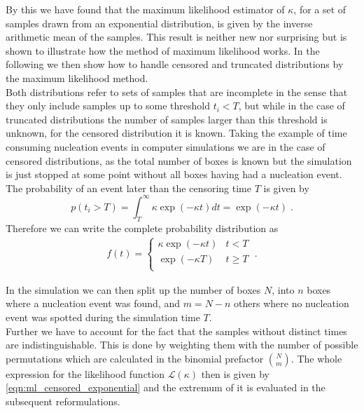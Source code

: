 By this we have found that the maximum likelihood estimator of $\kappa$, for a set of samples drawn from an exponential distribution, is given by the inverse arithmetic mean of the samples. This result is neither new nor surprising but is shown to illustrate how the method of maximum likelihood works. In the following we then show how to handle censored and truncated distributions by the maximum likelihood method.\\
Both distributions refer to sets of samples that are incomplete in the sense that they only include samples up to some threshold $t_i < T$, but while in the case of truncated distributions the number of samples larger than this threshold is unknown, for the censored distribution it is known. Taking the example of time consuming nucleation events in computer simulations we are in the case of censored distributions, as the total number of boxes is known but the simulation is just stopped at some point without all boxes having had a nucleation event. The probability of an event later than the censoring time $T$ is given by
\begin{equation}
\label{eqn:prob_t_larger_T}
p(t_i>T) = \int_T^{\infty} \kappa \exp(-\kappa t) dt = \exp(-\kappa t) \; \text{.}
\end{equation}
Therefore we can write the complete probability distribution as
\begin{align}
\label{eqn:pdf_censored}
f(t) = 
\begin{cases}
\kappa \exp(-\kappa t) & t < T\\
\exp(-\kappa T) & t \geq T\\ 
\end{cases} \; \text{.}
\end{align}


In the simulation we can then split up the number of boxes $N$, into $n$ boxes where a nucleation event was found, and $m = N -n$ others where no nucleation event was spotted during the simulation time $T$.\\
Further we have to account for the fact that the samples without distinct times are indistinguishable. This is done by weighting them with the number of possible permutations which are calculated in the binomial prefactor $\binom{N}{m}$. The whole expression for the likelihood function $\mathcal{L}(\kappa)$ then is given by \autoref{eqn:ml_censored_exponential} and the extremum of it is evaluated in the subsequent reformulations.

